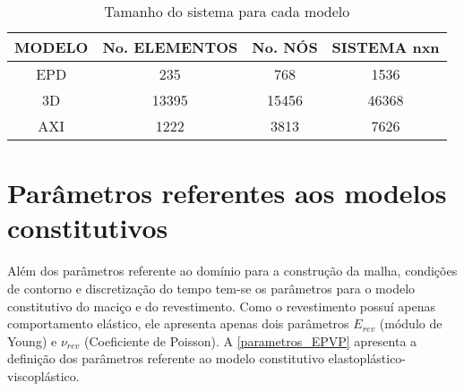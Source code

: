 \begin{table}[H]
	\caption{Tamanho do sistema para cada modelo}
	\label{tamanho_sistemas}
	\centering
	\small
	\renewcommand{\arraystretch}{1.25}
	\begin{tabular}{c c c c}
		\hline
		\multicolumn{1}{c}{\textbf{MODELO}} &
		\multicolumn{1}{c}{\textbf{No. ELEMENTOS}} &
		\multicolumn{1}{c}{\textbf{No. NÓS}} &
		\multicolumn{1}{c}{\textbf{SISTEMA nxn}} \\
		\hline
		EPD & 235 & 768 & 1536 \\
		3D & 13395 & 15456 & 46368 \\
		AXI & 1222 & 3813 & 7626 \\
		\hline
	\end{tabular}
	\normalsize
\end{table}

\section{Parâmetros referentes aos modelos constitutivos}
Além dos parâmetros referente ao domínio para a construção da malha, condições de contorno e discretização do tempo tem-se os parâmetros para o modelo constitutivo do maciço e do revestimento. Como o revestimento possuí apenas comportamento elástico, ele apresenta apenas dois parâmetros $E_{rev}$ (módulo de Young) e $\nu_{rev}$ (Coeficiente de Poisson). A \autoref{parametros_EPVP} apresenta a definição dos parâmetros referente ao modelo constitutivo elastoplástico-viscoplástico.
